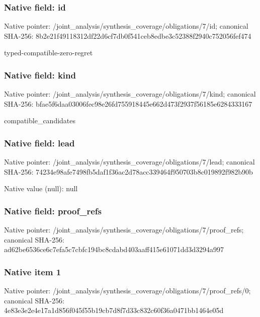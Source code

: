 \documentclass[10pt,a4paper]{article}
\begin{document}
\subsubsection{Native field: id}
Native pointer: /joint\_\allowbreak{}analysis/synthesis\_\allowbreak{}coverage/obligations/7/id; canonical SHA-256: 8b2e21f49118312df22d6cf7db0f541ceb8edbe3c52388f2940c752056fef474

\begingroup\raggedright\sloppy typed-compatible-zero-regret\par\endgroup

\subsubsection{Native field: kind}
Native pointer: /joint\_\allowbreak{}analysis/synthesis\_\allowbreak{}coverage/obligations/7/kind; canonical SHA-256: bfae5f6daa03006fec98e26fd755918445e662d473f2937f56185e6284333167

\begingroup\raggedright\sloppy compatible\_\allowbreak{}candidates\par\endgroup

\subsubsection{Native field: lead}
Native pointer: /joint\_\allowbreak{}analysis/synthesis\_\allowbreak{}coverage/obligations/7/lead; canonical SHA-256: 74234e98afe7498fb5daf1f36ac2d78acc339464f950703b8c019892f982b90b

Native value (null): null

\subsubsection{Native field: proof\_\allowbreak{}refs}
Native pointer: /joint\_\allowbreak{}analysis/synthesis\_\allowbreak{}coverage/obligations/7/proof\_\allowbreak{}refs; canonical SHA-256: ad62be6536ce6c7efa5c7cbfc194bc8cdabd403aaff415e61071dd3d3294a997

\subsubsection{Native item 1}
Native pointer: /joint\_\allowbreak{}analysis/synthesis\_\allowbreak{}coverage/obligations/7/proof\_\allowbreak{}refs/0; canonical SHA-256: 4e83e3e2e4e17a1d856f045f55b19cb7d8f7d33c832c60f36a0471bb1464e05d
\end{document}

